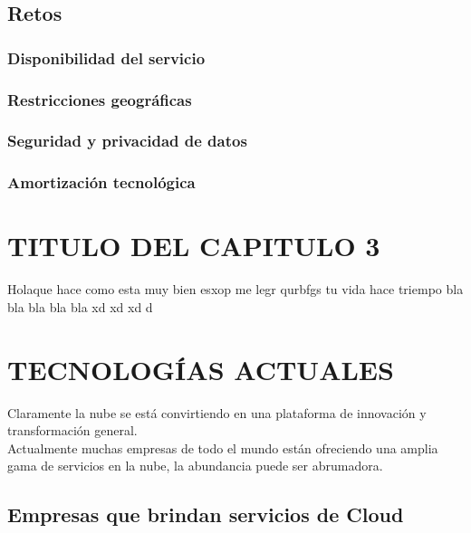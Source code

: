 \documentclass[a4paper, 12pt]{report}
\begin{document}
\section{Retos}
\subsection{Disponibilidad del servicio}
\subsection{Restricciones geogr\'aficas}
\subsection{Seguridad y privacidad de datos}
\subsection{Amortizaci\'on tecnol\'ogica}
\vspace*{5em}
\chapter{TITULO DEL CAPITULO 3}
\vspace*{-2em}
\begin{justify}
Holaque hace como esta muy bien esxop me legr qurbfgs tu vida hace triempo bla bla bla bla bla xd xd xd d
\end{justify}

\vspace*{5em}
\chapter{TECNOLOG\'IAS ACTUALES}
\vspace*{-2em}

Claramente la nube se est\'a convirtiendo en una plataforma de innovaci\'on y transformaci\'on general.
\\ Actualmente muchas empresas de todo el mundo est\'an ofreciendo una amplia gama de servicios en la nube, la abundancia puede ser abrumadora.
 
\section{Empresas que brindan servicios de Cloud}
\end{document}

